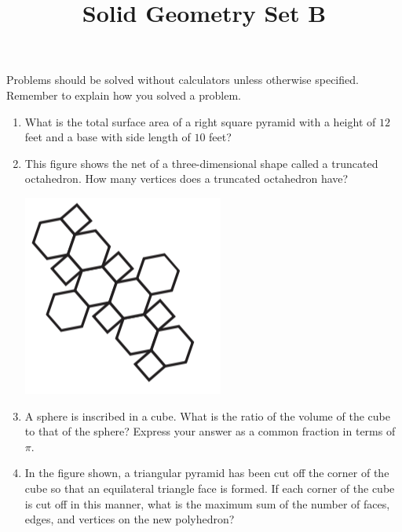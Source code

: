 \documentclass{article}
\title{Solid Geometry Set B}
\author{}
\date{}
\begin{document}
\maketitle
\noindent Problems should be solved without calculators unless otherwise specified.
Remember to explain how you solved a problem.
\begin{multicols}{2}
    \begin{enumerate}
        \item What is the total surface area of a right square pyramid with a height of $12$ feet and a base with side length of $10$ feet?
        \vspace{3cm}
        \item This figure shows the net of a three-dimensional shape called a truncated octahedron.
        How many vertices does a truncated octahedron have?
        \begin{center}
            \includegraphics[scale=0.5]{truncated_octahedron.png}
        \end{center}
        \vspace{3cm}
        \item A sphere is inscribed in a cube.
        What is the ratio of the volume of the cube to that of the sphere?
        Express your answer as a common fraction in terms of $\pi$.
        \vspace{3cm}
        \item In the figure shown, a triangular pyramid has been cut off the corner of the cube so that an equilateral triangle face is formed.
        If each corner of the cube is cut off in this manner, what is the maximum sum of the number of faces, edges, and vertices on the new polyhedron?
        \begin{center}
\end{center}
\end{enumerate}
\end{multicols}
\end{document}
